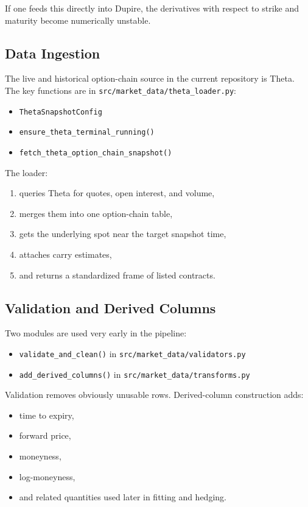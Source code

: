 \documentclass[11pt]{article}
\begin{document}
If one feeds this directly into Dupire, the derivatives with respect to strike and maturity become numerically unstable.

\subsection{Data Ingestion}

The live and historical option-chain source in the current repository is Theta. The key functions are in \texttt{src/market\_data/theta\_loader.py}:

\begin{itemize}
  \item \texttt{ThetaSnapshotConfig}
  \item \texttt{ensure\_theta\_terminal\_running()}
  \item \texttt{fetch\_theta\_option\_chain\_snapshot()}
\end{itemize}

The loader:

\begin{enumerate}
  \item queries Theta for quotes, open interest, and volume,
  \item merges them into one option-chain table,
  \item gets the underlying spot near the target snapshot time,
  \item attaches carry estimates,
  \item and returns a standardized frame of listed contracts.
\end{enumerate}

\subsection{Validation and Derived Columns}

Two modules are used very early in the pipeline:

\begin{itemize}
  \item \texttt{validate\_and\_clean()} in \texttt{src/market\_data/validators.py}
  \item \texttt{add\_derived\_columns()} in \texttt{src/market\_data/transforms.py}
\end{itemize}

Validation removes obviously unusable rows. Derived-column construction adds:

\begin{itemize}
  \item time to expiry,
  \item forward price,
  \item moneyness,
  \item log-moneyness,
  \item and related quantities used later in fitting and hedging.
\end{itemize}
\end{document}
